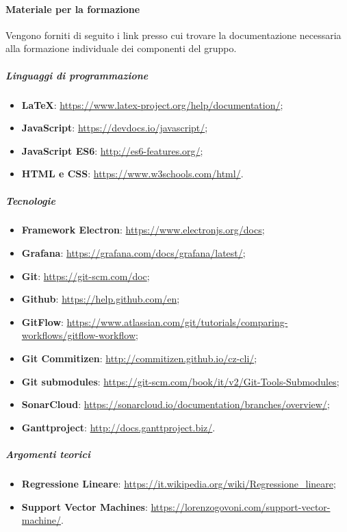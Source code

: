 \documentclass[../norme-di-progetto.tex]{subfiles}
\begin{document}
\paragraph{Materiale per la formazione}
Vengono forniti di seguito i link presso cui trovare la documentazione necessaria alla formazione individuale dei componenti del gruppo.

\subparagraph*{Linguaggi di programmazione}
\begin{itemize}
  \item \textbf{\LaTeX}: \href{https://www.latex-project.org/help/documentation/}{https://www.latex-project.org/help/documentation/};
  \item \textbf{JavaScript}: \href{https://devdocs.io/javascript/}{https://devdocs.io/javascript/};
  \item \textbf{JavaScript ES6}: \href{http://es6-features.org/}{http://es6-features.org/};
  \item \textbf{HTML e CSS}: \href{https://www.w3schools.com/html/}{https://www.w3schools.com/html/}.
\end{itemize}

\subparagraph*{Tecnologie}
\begin{itemize}
  \item \textbf{Framework Electron}: \href{https://www.electronjs.org/docs}{https://www.electronjs.org/docs};
  \item \textbf{Grafana}: \href{https://grafana.com/docs/grafana/latest/}{https://grafana.com/docs/grafana/latest/};
  \item \textbf{Git}: \href{https://git-scm.com/doc}{https://git-scm.com/doc};
  \item \textbf{Github}: \href{https://help.github.com/en}{https://help.github.com/en};
  \item \textbf{GitFlow}: \href{https://www.atlassian.com/git/tutorials/comparing-workflows/gitflow-workflow}{https://www.atlassian.com/git/tutorials/comparing-workflows/gitflow-workflow};
  \item \textbf{Git Commitizen}: \href{http://commitizen.github.io/cz-cli/}{http://commitizen.github.io/cz-cli/};
  \item \textbf{Git submodules}: \href{https://git-scm.com/book/it/v2/Git-Tools-Submodules}{https://git-scm.com/book/it/v2/Git-Tools-Submodules};
  \item \textbf{SonarCloud}: \href{https://sonarcloud.io/documentation/branches/overview/}{https://sonarcloud.io/documentation/branches/overview/};
  \item \textbf{Ganttproject}: \href{http://docs.ganttproject.biz/}{http://docs.ganttproject.biz/}.
\end{itemize}

\subparagraph*{Argomenti teorici}
\begin{itemize}
  \item \textbf{Regressione Lineare}: \href{https://it.wikipedia.org/wiki/Regressione_lineare}{https://it.wikipedia.org/wiki/Regressione\_lineare};
  \item \textbf{Support Vector Machines}: \href{https://lorenzogovoni.com/support-vector-machine/}{https://lorenzogovoni.com/support-vector-machine/}.
\end{itemize}
\end{document}
